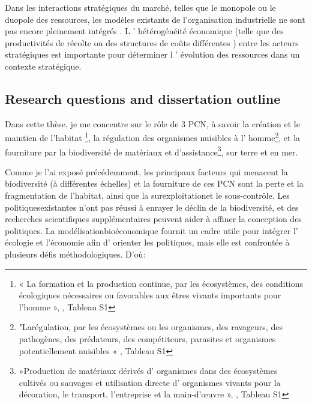\begin{displayquote}
\begin{displayquote}
\begin{displayquote}
{{{Dans les interactions stratégiques du marché, telles que le monopole ou le duopole des ressources, les modèles existants de l'organisation industrielle ne sont pas encore pleinement intégrés \citep{damania_economics_2007}.   L ' hétérogénéité économique (telle que des productivités de récolte ou des structures de coûts différentes ) entre les acteurs stratégiques est importante pour déterminer l ' évolution des ressources dans un contexte stratégique.

{}
\subsection*{Research questions and dissertation outline}

 
Dans cette thèse, je me concentre sur le rôle de 3 PCN, à savoir la création et le maintien de l'habitat \footnote{« La formation et la production continue, par les écosystèmes, des conditions écologiques nécessaires ou favorables aux êtres vivants importants pour l'homme », \citep{diaz_2018}, Tableau S1}, la régulation des organismes nuisibles à l' homme\footnote{"Larégulation, par les écosystèmes ou les organismes, des ravageurs, des pathogènes, des prédateurs, des compétiteurs, parasites et organismes potentiellement nuisibles « \citep{diaz_2018}, Tableau S1}, et la fourniture par la biodiversité de matériaux et d'assistance\footnote{ »Production de matériaux dérivés d' organismes dans des écosystèmes cultivés ou sauvages et utilisation directe d' organismes vivants pour la décoration, le transport, l'entreprise et la main-d'œuvre », \citep{diaz_2018}, Tableau S1}, sur terre et en mer. 



Comme je l'ai exposé précédemment, les principaux facteurs qui menacent la biodiversité (à différentes échelles) et la fourniture de ces PCN sont la perte et la fragmentation de l'habitat, ainsi que la surexploitationet le sous-contrôle. Les politiquesexistantes n'ont pas réussi à enrayer le déclin de la biodiversité, et des recherches scientifiques supplémentaires peuvent aider à affiner la conception des politiques. La modélisationbioéconomique fournit un cadre utile pour intégrer l' écologie et l'économie afin d' orienter les politiques, mais elle est confrontée à plusieurs défis méthodologiques.   D'où: 



\begin{displayquote}


\end{displayquote}}}}
\end{displayquote}
\end{displayquote}
\end{displayquote}
